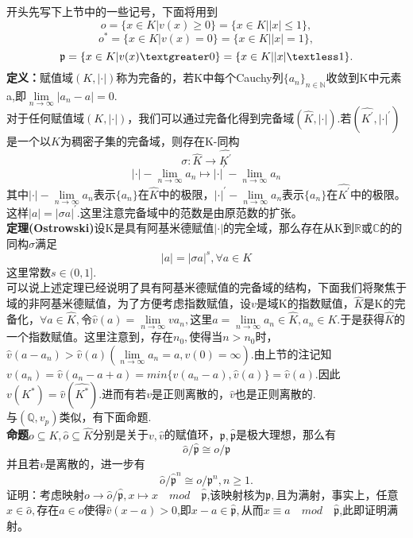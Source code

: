 \documentclass[UTF8]{article}
\begin{document}
    开头先写下上节中的一些记号，下面将用到
    $$o=\{x\in K|v(x)\geq 0\}=\{x\in K||x|\leq 1\},$$
    $$o^{*}=\{x\in K|v(x)=0\}=\{x\in K||x|=1\},$$
    $$\mathfrak{p}=\{x\in K|v(x)\textgreater0\}=\{x\in K||x|\textless 1\}.$$
    \textbf{定义：}赋值域$(K,|\cdot|)$称为完备的，若K中每个Cauchy列$\{a_{n}\}_{n\in \mathbb{N}}$收敛到K中元素a,即$\lim\limits_{n\rightarrow \infty }|a_{n}-a|=0.$\\
    对于任何赋值域$(K,|\cdot|)$，我们可以通过完备化得到完备域$(\widehat{K},|\cdot|).$若$(\widehat{K^{'}},|\cdot|^{'})$是一个以$K$为稠密子集的完备域，则存在K-同构$$\sigma :\widehat{K}\rightarrow  \widehat{K^{'}}$$
    $$|\cdot|-\lim\limits_{n\rightarrow \infty }a_{n}\mapsto |\cdot|^{'}-\lim\limits_{n\rightarrow \infty }a_{n}$$
    其中$|\cdot|-\lim\limits_{n\rightarrow \infty }a_{n}$表示$\{a_{n}\}$在$\widehat{K}$中的极限，$|\cdot|^{'}-\lim\limits_{n\rightarrow \infty }a_{n}$表示$\{a_{n}\}$在$\widehat{K^{'}}$中的极限。这样$|a|=|\sigma a|^{'}.$这里注意完备域中的范数是由原范数的扩张。\\
    \textbf{定理(Ostrowski)}设K是具有阿基米德赋值$|\cdot|$的完全域，那么存在从K到$\mathbb{R}$或$\mathbb{C}$的的同构$\sigma $满足$$
    |a|=|\sigma a|^{s},\forall a\in K
    $$
    这里常数$s\in (0,1].$\\
    可以说上述定理已经说明了具有阿基米德赋值的完备域的结构，下面我们将聚焦于域的非阿基米德赋值，为了方便考虑指数赋值，设$v$是域K的指数赋值，$\widehat{K}$是K的完备化，$\forall a\in \widehat{K},$令$\widehat{v}(a)=\lim\limits_{n\rightarrow \infty }v{a_{n}},$这里$a=\lim\limits_{n\rightarrow \infty }a_{n}\in \widehat{K},a_{n}\in K.$于是获得$\widehat{K}$的一个指数赋值。这里注意到，存在$n_{0},$使得当$n>n_{0}$时，$\widehat{v}(a-a_{n})>\widehat{v}(a)(\lim\limits_{n\rightarrow \infty}a_{n}=a,v(0)=\infty ).$由上节的注记知$v(a_{n})=\widehat{v}(a_{n}-a+a)=min\{\widehat{v}(a_{n}-a),\widehat{v}(a)\}=\widehat{v}(a).$因此$v(K^{*})=\widehat{v}(\widehat{K^{*}})$.进而有若$v$是正则离散的，$\widehat{v}$也是正则离散的.\\
    与$(\mathbb{Q},v_{p})$类似，有下面命题.\\
    \textbf{命题}$o\subseteq K,\widehat{o}\subseteq \widehat{K}$分别是关于$v,\widehat{v}$的赋值环，$\mathfrak{p},\widehat{\mathfrak{p}}$是极大理想，那么有$$
    \widehat{o}/\widehat{\mathfrak{p}}\cong o/\mathfrak{p}
    $$
    并且若$v$是离散的，进一步有$$
    \widehat{o}/\widehat{\mathfrak{p}}^{n}\cong o/\mathfrak{p}^{n},n\geq 1.
    $$
    证明：考虑映射$o\rightarrow \widehat{o}/\widehat{\mathfrak{p}},x\mapsto x\quad mod \quad \widehat{\mathfrak{p}}$,该映射核为$\mathfrak{p},$且为满射，事实上，任意$x\in\widehat{o},$存在$a\in o$使得$\widehat{v}(x-a)>0$,即$x-a\in \widehat{\mathfrak{p}},$从而$x\equiv a\quad mod \quad \widehat{\mathfrak{p}}$,此即证明满射。\\
\end{document}
